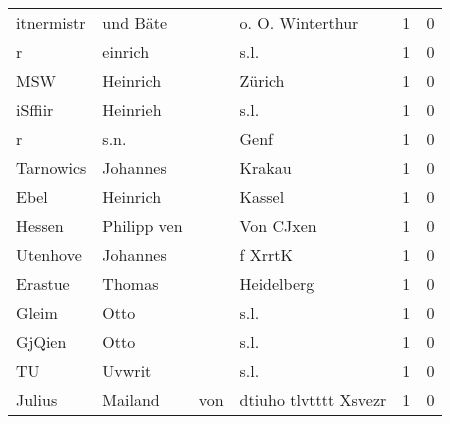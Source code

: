 \begin{center}
\begin{tiny}
\begin{longtabu}{llllrr}
               itnermistr &                           und Bäte &             &                            o. O. Winterthur &          1 &         0 \\
                        r &                            einrich &             &                                        s.l. &          1 &         0 \\
                      MSW &                           Heinrich &             &                                      Zürich &          1 &         0 \\
                  iSffiir &                           Heinrieh &             &                                        s.l. &          1 &         0 \\
                        r &                               s.n. &             &                                        Genf &          1 &         0 \\
                Tarnowics &                           Johannes &             &                                      Krakau &          1 &         0 \\
                     Ebel &                           Heinrich &             &                                      Kassel &          1 &         0 \\
                   Hessen &                        Philipp ven &             &                                   Von CJxen &          1 &         0 \\
                 Utenhove &                           Johannes &             &                                     f XrrtK &          1 &         0 \\
                  Erastue &                             Thomas &             &                                  Heidelberg &          1 &         0 \\
                    Gleim &                               Otto &             &                                        s.l. &          1 &         0 \\
                   GjQien &                               Otto &             &                                        s.l. &          1 &         0 \\
                       TU &                             Uvwrit &             &                                        s.l. &          1 &         0 \\
                   Julius &                            Mailand &         von &                       dtiuho tlvtttt Xsvezr &          1 &         0 \\

\end{longtabu}
\end{tiny}
\end{center}

